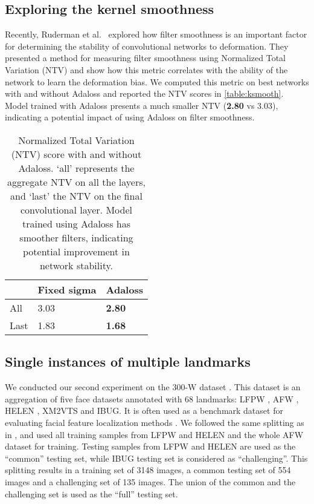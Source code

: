 \documentclass[10pt,twocolumn,letterpaper]{article}
\begin{document}
\subsection*{Exploring the kernel smoothness}

Recently, Ruderman et al.~\cite{deformstab} explored how filter
smoothness is an important factor for determining the stability of
convolutional networks to deformation. They presented a method for
measuring filter smoothness using Normalized Total Variation (NTV) and
show how this metric correlates with the ability of the network to
learn the deformation bias. We computed this metric on best networks
with and without Adaloss and reported the NTV
scores in \autoref{table:ksmooth}. Model trained with Adaloss presents
a much smaller NTV (\textbf{2.80} vs 3.03),
indicating a potential impact of using Adaloss on filter smoothness.

\begin{table}[h]
  \centering
  \begin{tabular}{|l|l|l|}
    \hline
    & Fixed sigma & Adaloss \\
    \hline
    All & 3.03 & \textbf{2.80} \\
    \hline
    Last & 1.83 & \textbf{1.68} \\
    \hline
  \end{tabular}
  \caption{Normalized Total Variation (NTV) score
    with and without Adaloss. `all' represents
    the aggregate NTV on all the layers, and `last' the NTV on the final
    convolutional layer. Model trained using Adaloss has smoother
    filters, indicating potential improvement in network stability.}
  \label{table:ksmooth}
\end{table}


\subsection{Single instances of multiple landmarks}

We conducted our second experiment on the 300-W dataset \cite{300w,300w_2,300w_3}.
This dataset is an aggregation of five face datasets annotated with 68
landmarks: LFPW \cite{lfpw}, AFW \cite{afw}, HELEN \cite{helen}, XM2VTS and IBUG. It is often used as a benchmark dataset for evaluating facial feature localization methods \cite{poseinvar, MDM, CFSS}. We followed the same splitting as in \cite{san, sbr, CFSS, twostage}, and used all training samples
from LFPW and HELEN and the whole AFW dataset for training. Testing
samples from LFPW and HELEN are used as the ``common'' testing set,
while IBUG testing set is considered as ``challenging''. This
splitting results in a training set of 3148 images, a common testing
set of 554 images and a challenging set of 135 images. The union of
the common and the challenging set is used as the ``full'' testing
set.
\end{document}
